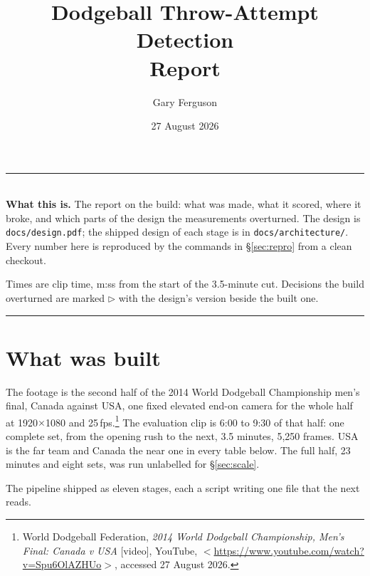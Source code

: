 \documentclass[10pt,a4paper]{article}
\title{\vspace{-16mm}\bfseries\color{slate}Dodgeball Throw-Attempt Detection\\[1mm]
       \large\mdseries Report}
\author{Gary Ferguson}
\date{\vspace{-2mm}27 August 2026}
\begin{document}
\maketitle
\thispagestyle{empty}

\noindent
\begin{minipage}{\textwidth}
\small\color{slate}
\rule{\textwidth}{0.4pt}\\[3pt]
\textbf{What this is.} The report on the build: what was made, what it scored, where it
broke, and which parts of the design the measurements overturned. The design is
\texttt{docs/design.pdf}; the shipped design of each stage is in
\texttt{docs/architecture/}. Every number here is reproduced by the commands in
\S\ref{sec:repro} from a clean checkout.

Times are clip time, m:ss from the start of the 3.5-minute cut. Decisions the build
overturned are marked \textcolor{accent!88!black}{$\triangleright$} with the design's
version beside the built one.\\[2pt]
\rule{\textwidth}{0.4pt}
\end{minipage}

\vspace{1mm}
{\small\setcounter{tocdepth}{2}\tableofcontents}
\clearpage

\section{What was built}
\label{sec:built}

The footage is the second half of the 2014 World Dodgeball Championship men's final,
Canada against USA, one fixed elevated end-on camera for the whole half at 1920$\times$1080
and 25\,fps.\footnote{World Dodgeball Federation, \emph{2014 World Dodgeball
Championship, Men's Final: Canada v USA} [video], YouTube,
$<$\url{https://www.youtube.com/watch?v=Spu6OlAZHUo}$>$, accessed 27 August 2026.} The
evaluation clip is 6:00 to 9:30 of that half: one complete set, from the opening rush to
the next, 3.5 minutes, 5,250 frames. USA is the far team and Canada the near one in every
table below. The full half, 23 minutes and eight sets, was run unlabelled for
\S\ref{sec:scale}.

The pipeline shipped as eleven stages, each a script writing one file that the next reads.
\end{document}
